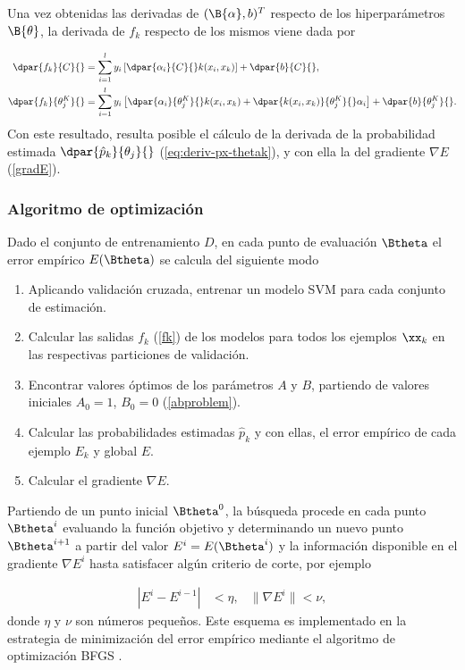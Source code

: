Una vez obtenidas las derivadas de $({\B{\alpha},b})^T$ respecto de
los hiperparámetros $\B{\theta}$, la derivada de $f_k$  respecto
de los mismos viene dada por

\begin{align}
  \dpar{f_k}{C}{} &=  \sum_{i=1}^l y_i\left[
    \dpar{\alpha_i}{C}{} k(x_i,x_k) \right]
  + \dpar{b}{C}{} ,\\
  \dpar{f_k}{\theta^K_j}{} &=  \sum_{i=1}^l y_i \left[
    \dpar{\alpha_i}{\theta^K_j}{} k(x_i,x_k) +
    \dpar{k(x_i,x_k)}{\theta^K_j}{} \alpha_i \right]
  + \dpar{b}{\theta^K_j}{}. 
\end{align}
Con este resultado, resulta posible el cálculo de la derivada de la
probabilidad estimada $\dpar{\hat{p}_k}{\theta_j}{}$
(\autoref{eq:deriv-px-thetak}), y con ella la del gradiente
$\nabla{}E$ (\autoref{gradE}).

\subsubsection{Algoritmo de optimización}
Dado el conjunto de entrenamiento $D$, en cada punto de evaluación
$\Btheta$ el error empírico $E(\Btheta)$ se calcula del siguiente modo

\begin{enumerate}
\item Aplicando validación cruzada, entrenar un modelo SVM para cada
  conjunto de estimación.
\item Calcular las salidas $f_k$ (\autoref{fk}) de los
  modelos para todos los ejemplos $\xx_k$ en las respectivas
  particiones de validación.
\item Encontrar valores óptimos de los parámetros $A$ y $B$, partiendo
  de valores iniciales $A_0=1$, $B_0=0$ (\autoref{abproblem}).
\item Calcular las probabilidades estimadas $\hat{p}_k$ y con ellas,
  el error empírico de cada ejemplo $E_k$ y global $E$.
\item Calcular el gradiente $\nabla{}E$.
\end{enumerate}
Partiendo de un punto inicial $\Btheta^0$, la búsqueda procede en cada
punto $\Btheta^i$ evaluando la función objetivo y determinando un
nuevo punto $\Btheta^{i+1}$ a partir del valor $E^i=E(\Btheta^i)$ y la
información disponible en el gradiente $\nabla{}E^i$ hasta satisfacer
algún criterio de corte, por ejemplo

\begin{align*}
  |E^i-E^{i-1}|&<\eta, & \|\nabla E^i\| < \nu,
\end{align*}
donde $\eta$ y $\nu$ son números pequeños.  Este esquema es
implementado en la estrategia de minimización del error empírico
mediante el algoritmo de optimización BFGS \cite{bfgs}.

